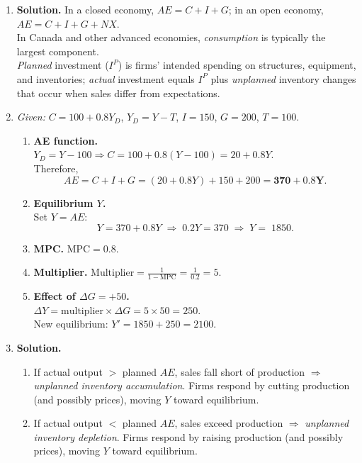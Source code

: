 \documentclass[12pt]{article}
\begin{document}
\begin{enumerate}[label=\textbf{ \arabic*.}, start=5, leftmargin=1.5em]

\item \textbf{Solution.} In a closed economy, $AE=C+I+G$; in an open economy, $AE=C+I+G+NX$. \\
In Canada and other advanced economies, \emph{consumption} is typically the largest component. \\
\emph{Planned} investment ($I^P$) is firms' intended spending on structures, equipment, and inventories; \emph{actual} investment equals $I^P$ plus \emph{unplanned} inventory changes that occur when sales differ from expectations.

\vspace{0.75em}

\item \emph{Given:} $C=100+0.8Y_D$, $Y_D=Y-T$, $I=150$, $G=200$, $T=100$.
\begin{enumerate}[label=(\alph*)]
\item \textbf{AE function.}\\
$Y_D=Y-100 \Rightarrow C=100+0.8(Y-100)=20+0.8Y$. \\
Therefore,
\[
AE = C+I+G = (20+0.8Y)+150+200 = \mathbf{370+0.8Y}.
\]

\item \textbf{Equilibrium $Y$.}\\
Set $Y=AE$:
\[
Y=370+0.8Y \;\Rightarrow\; 0.2Y=370 \;\Rightarrow\; \boxed{Y=\;1850}.
\]

\item \textbf{MPC.} \quad $\boxed{\text{MPC}=0.8.}$

\item \textbf{Multiplier.} \quad $\displaystyle \boxed{\text{Multiplier}=\frac{1}{1-\text{MPC}}=\frac{1}{0.2}=5.}$

\item \textbf{Effect of $\Delta G=+50$.}\\
$\Delta Y = \text{multiplier}\times \Delta G = 5\times 50 = 250$. \\
New equilibrium: $\boxed{Y' = 1850+250 = 2100.}$
\end{enumerate}

\vspace{0.75em}

\item \textbf{Solution.}
\begin{enumerate}[label=(\alph*)]
\item If actual output $>$ planned $AE$, sales fall short of production $\Rightarrow$ \emph{unplanned inventory accumulation}. Firms respond by cutting production (and possibly prices), moving $Y$ toward equilibrium.
\item If actual output $<$ planned $AE$, sales exceed production $\Rightarrow$ \emph{unplanned inventory depletion}. Firms respond by raising production (and possibly prices), moving $Y$ toward equilibrium.
\end{enumerate}


\end{enumerate}
\end{document}
